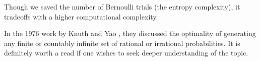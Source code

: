 Though we saved the number of Bernoulli trials (the entropy complexity), it tradeoffs with a higher computational complexity.

\begin{remark}
    In the 1976 work by Knuth and Yao \cite{Complexity_Nonunif_Rand}, they discussed the optimality of generating any finite or countably infinite set of rational or irrational probabilities. It is definitely worth a read if one wishes to seek deeper understanding of the topic.
\end{remark}